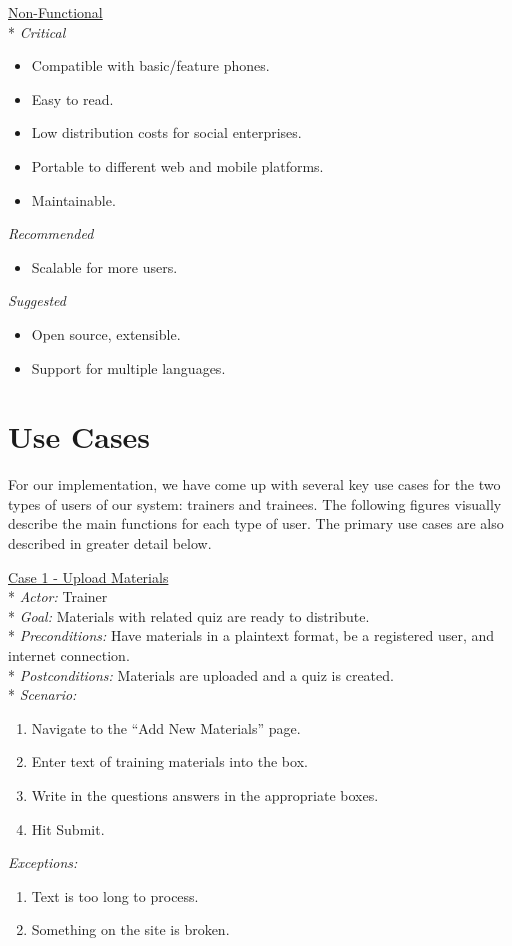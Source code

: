 \underline{Non-Functional}\\*
\textit{Critical}
\begin{itemize}
\item Compatible with basic/feature phones.
\item Easy to read.
\item Low distribution costs for social enterprises.
\item Portable to different web and mobile platforms.
\item Maintainable.
\end{itemize}

\textit{Recommended}
\begin{itemize}
\item Scalable for more users.
\end{itemize}

\textit{Suggested}
\begin{itemize}
\item Open source, extensible.
\item Support for multiple languages.
\end{itemize}

\section{Use Cases}
For our implementation, we have come up with several key use cases for the two types of users of our system: trainers and trainees. The following figures visually describe the main functions for each type of user. The primary use cases are also described in greater detail below.

\underline{Case 1 - Upload Materials}\\*
\textit{Actor:} Trainer\\*
\textit{Goal:} Materials with related quiz are ready to distribute.\\*
\textit{Preconditions:} Have materials in a plaintext format, be a registered user, and internet connection.\\*
\textit{Postconditions:} Materials are uploaded and a quiz is created.\\*
\textit{Scenario:}
\begin{enumerate}
	\item{Navigate to the “Add New Materials” page.}
	\item{Enter text of training materials into the box.}
	\item{Write in the questions answers in the appropriate boxes.}
	\item{Hit Submit.}
\end{enumerate}
\textit{Exceptions:}
\begin{enumerate}
	\item{Text is too long to process.}
	\item{Something on the site is broken.}\\
\end{enumerate}

